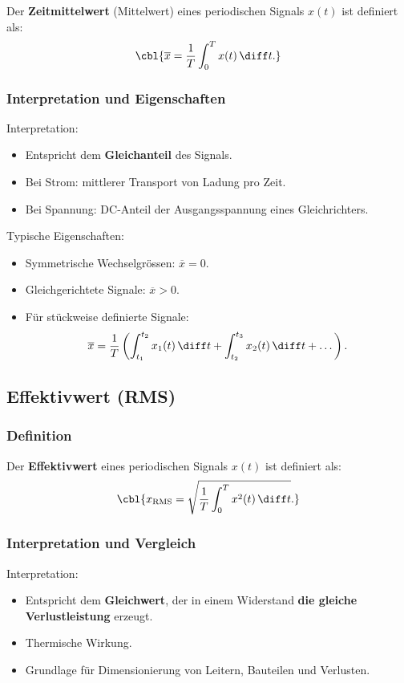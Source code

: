 Der \textbf{Zeitmittelwert} (Mittelwert) eines periodischen Signals $x(t)$ ist definiert als:
\[
\cbl{\overline{x} = \frac{1}{T} \int_{0}^{T} x(t)\,\diff t.}
\]

\subsubsection{Interpretation und Eigenschaften}

Interpretation:
\begin{itemize}
    \item Entspricht dem \textbf{Gleichanteil} des Signals.
    \item Bei Strom: mittlerer Transport von Ladung pro Zeit.
    \item Bei Spannung: DC-Anteil der Ausgangsspannung eines Gleichrichters.
\end{itemize}

Typische Eigenschaften:
\begin{itemize}
    \item Symmetrische Wechselgrössen: $\overline{x}=0$.
    \item Gleichgerichtete Signale: $\overline{x}>0$.
    \item Für stückweise definierte Signale:
    \[
    \overline{x} = \frac{1}{T} \left( \int_{t_1}^{t_2} x_1(t)\,\diff t + \int_{t_2}^{t_3} x_2(t)\,\diff t + \dots \right).
    \]
\end{itemize}


\subsection{Effektivwert (RMS)}

\subsubsection{Definition}

Der \textbf{Effektivwert} eines periodischen Signals $x(t)$ ist definiert als:
\[
\cbl{x_{\mathrm{RMS}} = \sqrt{\frac{1}{T} \int_{0}^{T} x^2(t)\,\diff t}.}
\]

\subsubsection{Interpretation und Vergleich}

Interpretation:
\begin{itemize}
    \item Entspricht dem \textbf{Gleichwert}, der in einem Widerstand \textbf{die gleiche Verlustleistung} erzeugt.
    \item Thermische Wirkung.
    \item Grundlage für Dimensionierung von Leitern, Bauteilen und Verlusten.
\end{itemize}

